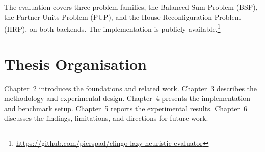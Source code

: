 The evaluation covers three problem families, the Balanced Sum Problem (BSP), the Partner Units Problem (PUP), and the House Reconfiguration Problem (HRP), on both backends. The implementation is publicly available.\footnote{\url{https://github.com/pierspad/clingo-lazy-heuristic-evaluator}}

\section{Thesis Organisation}
Chapter~2 introduces the foundations and related work. Chapter~3 describes the methodology and experimental design. Chapter~4 presents the implementation and benchmark setup. Chapter~5 reports the experimental results. Chapter~6 discusses the findings, limitations, and directions for future work.
